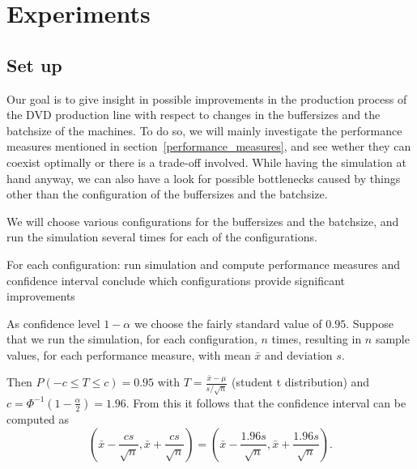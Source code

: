 \documentclass{article}
\begin{document}





\section{Experiments}
%
\subsection{Set up}
Our goal is to give insight in possible improvements in the production process of the DVD production line with respect to changes in the buffersizes and the batchsize of the machines.
To do so, we will mainly investigate the performance measures mentioned in section~\ref{performance_measures}, and see wether they can coexist optimally or there is a trade-off involved.
While having the simulation at hand anyway, we can also have a look for possible bottlenecks caused by things other than the configuration of the buffersizes and the batchsize.

We will choose various configurations for the buffersizes and the batchsize, and run the simulation several times for each of the configurations.

For each configuration:
    run simulation and compute performance measures and confidence interval
    conclude which configurations provide significant improvements


As confidence level $1 - \alpha$ we choose the fairly standard value of $0.95$.
Suppose that we run the simulation, for each configuration, $n$ times, resulting in $n$ sample values, for each performance measure, with mean $\bar{x}$ and deviation $s$.

Then $P(-c \leq T \leq c) = 0.95 $ with $T = \frac{\bar{x} - \mu}{s/\sqrt{n}}$ (student t distribution) and $c = \Phi ^{-1} (1 - \frac{\alpha}{2})= 1.96$.
From this it follows that the confidence interval can be computed as
\[ (\bar{x} - \frac{cs}{\sqrt{n}}, \bar{x} + \frac{cs}{\sqrt{n}}) =
(\bar{x} - \frac{1.96s}{\sqrt{n}}, \bar{x} + \frac{1.96s}{\sqrt{n}}). \]
\end{document}
